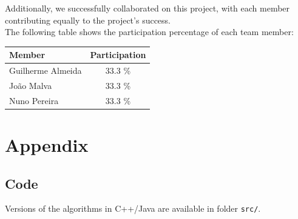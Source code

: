 \documentclass[11pt,a4paper]{article}
\begin{document}
Additionally, we successfully collaborated on this project, with each member contributing equally to the project's success.\\

The following table shows the participation percentage of each team member:


\begin{table}[H]
    \centering
    \begin{tabular}{||l c||} 
        \hline
        Member & Participation \\ [0.5ex] 
        \hline\hline
        Guilherme Almeida & 33.3 \% \\
        João Malva & 33.3 \% \\
        Nuno Pereira & 33.3 \% \\
        \hline
    \end{tabular}
\end{table}

\pagebreak


\appendix
\section{Appendix}

\subsection{Code}

\noindent Versions of the algorithms in C++/Java are available in folder \lstinline{src/}.

\printindex
\end{document}
